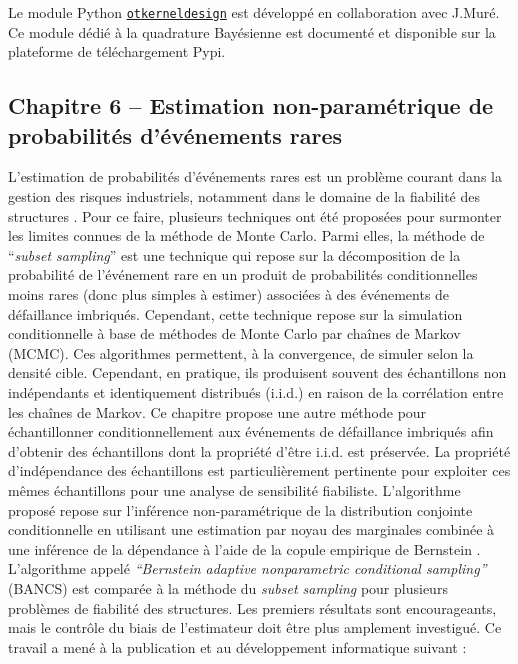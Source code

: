 \noindent
{} Le module Python \href{https://efekhari27.github.io/otkerneldesign/master/}{\texttt{otkerneldesign}} est développé en collaboration avec J.Muré. Ce module dédié à la quadrature Bayésienne est documenté et disponible sur la plateforme de téléchargement Pypi. 


\subsection*{Chapitre 6 -- Estimation non-paramétrique de probabilités d'événements rares \label{sec:chap6}}

L'estimation de probabilités d'événements rares est un problème courant dans la gestion des risques industriels, notamment dans le domaine de la fiabilité des structures \cite{chabridon_2018_thesis}. 
Pour ce faire, plusieurs techniques ont été proposées pour surmonter les limites connues de la méthode de Monte Carlo. 
Parmi elles, la méthode de ``\textit{subset sampling}'' \cite{AuBeck2001} est une technique qui repose sur la décomposition de la probabilité de l'événement rare en un produit de probabilités conditionnelles moins rares (donc plus simples à estimer) associées à des événements de défaillance imbriqués. 
Cependant, cette technique repose sur la simulation conditionnelle à base de méthodes de Monte Carlo par chaînes de Markov (MCMC). 
Ces algorithmes permettent, à la convergence, de simuler selon la densité cible. 
Cependant, en pratique, ils produisent souvent des échantillons non indépendants et identiquement distribués (i.i.d.) en raison de la corrélation entre les chaînes de Markov. 
Ce chapitre propose une autre méthode pour échantillonner conditionnellement aux événements de défaillance imbriqués afin d'obtenir des échantillons dont la propriété d'être i.i.d. est préservée. 
La propriété d'indépendance des échantillons est particulièrement pertinente pour exploiter ces mêmes échantillons pour une analyse de sensibilité fiabiliste. 
L'algorithme proposé repose sur l'inférence non-paramétrique de la distribution conjointe conditionnelle en utilisant une estimation par noyau des marginales combinée à une inférence de la dépendance à l'aide de la copule empirique de Bernstein \cite{sancetta_satchell_2004}. 
L'algorithme appelé \textit{``Bernstein adaptive nonparametric conditional sampling''} (BANCS) est comparée à la méthode du \textit{subset sampling} pour plusieurs problèmes de fiabilité des structures. 
Les premiers résultats sont encourageants, mais le contrôle du biais de l'estimateur doit être plus amplement investigué. 
Ce travail a mené à la publication et au développement informatique suivant : \\

